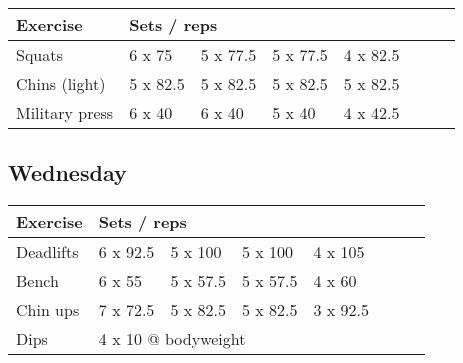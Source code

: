 \documentclass[12pt, a4paper]{article}%
\begin{document}
  \begin{tabular}{l|lllllll}
  \hspace{0.75em} \textbf{Exercise} & \multicolumn{ 7 }{l}{ \textbf{Sets / reps} } \\ \hline

            \hspace{0.75em} Squats
            & 6 x 75
            & 5 x 77.5
            & 5 x 77.5
            & 4 x 82.5
            & 
            & 
            & 
            \\


            \hspace{0.75em} Chins (light)
            & 5 x 82.5
            & 5 x 82.5
            & 5 x 82.5
            & 5 x 82.5
            & 
            & 
            & 
            \\


            \hspace{0.75em} Military press
            & 6 x 40
            & 6 x 40
            & 5 x 40
            & 4 x 42.5
            & 
            & 
            & 
            \\


  \end{tabular}

  \subsection*{\hspace{0.5em} Wednesday }


  \begin{tabular}{l|lllllll}
  \hspace{0.75em} \textbf{Exercise} & \multicolumn{ 7 }{l}{ \textbf{Sets / reps} } \\ \hline

            \hspace{0.75em} Deadlifts
            & 6 x 92.5
            & 5 x 100
            & 5 x 100
            & 4 x 105
            & 
            & 
            & 
            \\


            \hspace{0.75em} Bench
            & 6 x 55
            & 5 x 57.5
            & 5 x 57.5
            & 4 x 60
            & 
            & 
            & 
            \\


            \hspace{0.75em} Chin ups
            & 7 x 72.5
            & 5 x 82.5
            & 5 x 82.5
            & 3 x 92.5
            & 
            & 
            & 
            \\


   \hspace{0.75em} Dips &  \multicolumn{ 7 }{l}{ 4 x 10 @ bodyweight } \\
  \end{tabular}
\end{document}
